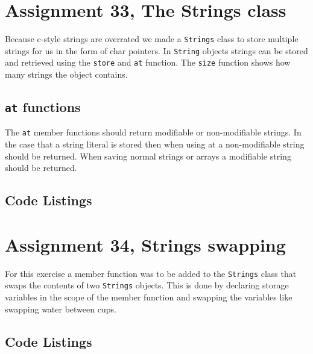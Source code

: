 \documentclass[11pt]{article}
\begin{document}
\section*{Assignment 33, The Strings class}
Because c-style strings are overrated we made a \texttt{Strings} class to store multiple strings for us in the form of char pointers.
In \texttt{String} objects strings can be stored and retrieved using the \texttt{store} and \texttt{at} function.
The \texttt{size} function shows how many strings the object contains.

\subsection*{\texttt{at} functions}
The \texttt{at} member functions should return modifiable or non-modifiable strings. In the case that a string literal is stored then when using at a non-modifiable string should be returned. When saving normal strings or arrays a modifiable string should be returned.

\subsection*{Code Listings}









\section*{Assignment 34, Strings swapping}
For this exercise a member function was to be added to the \texttt{Strings} class that swaps the contents of two \texttt{Strings} objects. This is done by declaring storage variables in the scope of the member function and swapping the variables like swapping water between cups.

\subsection*{Code Listings}


\end{document}
